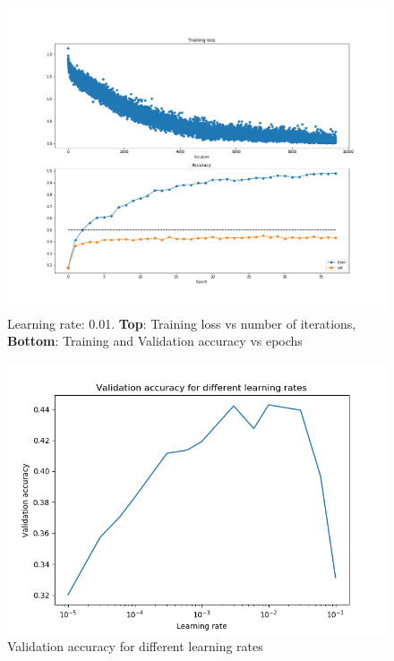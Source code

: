 \documentclass[12pt,twoside]{article}
\begin{document}
\begin{figure}[!htbp]
\centering %
\includegraphics[width = 1\hsize]{./figures/l_rate_0_01.png} %
\caption{Learning rate: 0.01. \textbf{Top}: Training loss vs number of iterations, \textbf{Bottom}: Training and Validation accuracy vs epochs} %
\label{lrate0_01}
\end{figure}

\begin{figure}[!htbp]
\centering %
\includegraphics[width = 0.8\hsize]{./figures/learning_rate_val_accuracy.png} %
\caption{Validation accuracy for different learning rates} %
\label{learnin_rate_val_acc}
\end{figure}
\end{document}
